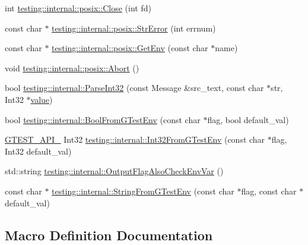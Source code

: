 \begin{DoxyCompactItemize}
\item 
int \mbox{\hyperlink{namespacetesting_1_1internal_1_1posix_a15e5b8f2a535ef1b2529b85b861e4846}{testing\+::internal\+::posix\+::\+Close}} (int fd)
\item 
const char $\ast$ \mbox{\hyperlink{namespacetesting_1_1internal_1_1posix_a6e7e77c37cacb64c32234b988b10933c}{testing\+::internal\+::posix\+::\+Str\+Error}} (int errnum)
\item 
const char $\ast$ \mbox{\hyperlink{namespacetesting_1_1internal_1_1posix_aa78973d3f7aa4efd24742b0537c8cd50}{testing\+::internal\+::posix\+::\+Get\+Env}} (const char $\ast$name)
\item 
void \mbox{\hyperlink{namespacetesting_1_1internal_1_1posix_a69b8278c59359dd6a6f941b4643db9fb}{testing\+::internal\+::posix\+::\+Abort}} ()
\item 
bool \mbox{\hyperlink{namespacetesting_1_1internal_ac06fc81336a3d80755f4020d34321766}{testing\+::internal\+::\+Parse\+Int32}} (const Message \&src\+\_\+text, const char $\ast$str, Int32 $\ast$\mbox{\hyperlink{_obj__test_2lib_2googletest-master_2googlemock_2test_2gmock-matchers__test_8cc_a337b8a670efc0b086ad3af163f3121b6}{value}})
\item 
bool \mbox{\hyperlink{namespacetesting_1_1internal_a67132cdce23fb71b6c38ee34ef81eb4c}{testing\+::internal\+::\+Bool\+From\+G\+Test\+Env}} (const char $\ast$flag, bool default\+\_\+val)
\item 
\mbox{\hyperlink{_obj__test_2lib_2googletest-release-1_88_81_2googletest_2include_2gtest_2internal_2gtest-port_8h_aa73be6f0ba4a7456180a94904ce17790}{G\+T\+E\+S\+T\+\_\+\+A\+P\+I\+\_\+}} Int32 \mbox{\hyperlink{namespacetesting_1_1internal_a0f7e728793f9e6cb0aa2b69eaa468bf3}{testing\+::internal\+::\+Int32\+From\+G\+Test\+Env}} (const char $\ast$flag, Int32 default\+\_\+val)
\item 
std\+::string \mbox{\hyperlink{namespacetesting_1_1internal_a0c793c6d84760d900299916c077a1af4}{testing\+::internal\+::\+Output\+Flag\+Also\+Check\+Env\+Var}} ()
\item 
const char $\ast$ \mbox{\hyperlink{namespacetesting_1_1internal_a7ed785df46a339403b0f749d3a879201}{testing\+::internal\+::\+String\+From\+G\+Test\+Env}} (const char $\ast$flag, const char $\ast$default\+\_\+val)
\end{DoxyCompactItemize}


\subsection{Macro Definition Documentation}
\mbox{\label{_obj__test_2lib_2googletest-release-1_88_81_2googletest_2include_2gtest_2internal_2gtest-port_8h_ab389953fc1f7e4efae30d182a0e0a13b}} 
